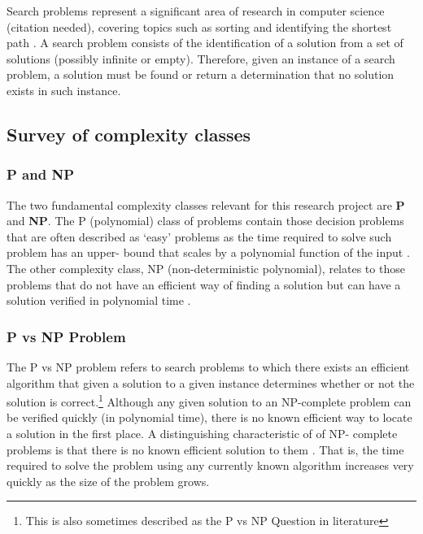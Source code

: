 \documentclass[11pt, a4paper, oneside]{report} %
\begin{document}
Search problems represent a significant area of research in computer science
(citation needed), covering topics such as sorting and identifying the shortest
path \cite{Goldreich:2008}. A search problem consists of the identification of a
solution from a set of solutions (possibly infinite or empty). Therefore, given
an instance of a search problem, a solution must be found or return a
determination that no solution exists in such instance.

\subsection{Survey of complexity classes}

\subsubsection{P and NP}

The two fundamental complexity classes relevant for this research project are
\textbf{P} and \textbf{NP}\@. The P (polynomial) class of problems contain those
decision problems that are often described as `easy' problems
\cite{kendall2008survey} as the time required to solve such problem has an
upper- bound that scales by a polynomial function of the input
\cite{sipser2012introduction}. The other complexity class, NP (non-deterministic
polynomial), relates to those problems that do not have an efficient way of
finding a solution but can have a solution verified in polynomial time
\cite{Goldreich:2008, Papadimitriou:2003:CC:1074100.1074233}.





\subsubsection{P vs NP Problem}

The P vs NP problem refers to search problems to which there exists an efficient
algorithm that given a solution to a given instance determines whether or not
the solution is correct\cite{sipser2012introduction,Goldreich:2008,kendall2008su
rvey,du2011theory}.\footnote{This is also sometimes described as the P vs NP
Question in literature} Although any given solution to an NP-complete problem
can be verified quickly (in polynomial time), there is no known efficient way to
locate a solution in the first place. A distinguishing characteristic of of NP-
complete problems is that there is no known efficient solution to them
\cite{Goldreich:2008}. That is, the time required to solve the problem using any
currently known algorithm increases very quickly as the size of the problem
grows.
\end{document}
